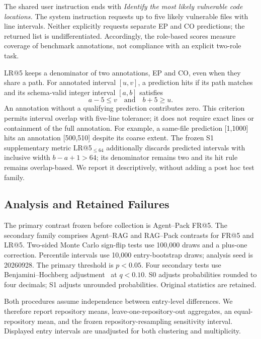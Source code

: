 The shared user instruction ends with \emph{Identify the most likely vulnerable code locations.} The system instruction requests up to five likely vulnerable files with line intervals. Neither explicitly requests separate EP and CO predictions; the returned list is undifferentiated. Accordingly, the role-based scores measure coverage of benchmark annotations, not compliance with an explicit two-role task.

LR@5 keeps a denominator of two annotations, EP and CO, even when they share a path. For annotated interval $[u,v]$, a prediction hits if its path matches and its schema-valid integer interval $[a,b]$ satisfies
\begin{equation}
 a-5\leq v\quad\text{and}\quad b+5\geq u.
\end{equation}
An annotation without a qualifying prediction contributes zero. This criterion permits interval overlap with five-line tolerance; it does not require exact lines or containment of the full annotation. For example, a same-file prediction [1,1000] hits an annotation [500,510] despite its coarse extent. The frozen S1 supplementary metric LR@5$_{\leq64}$ additionally discards predicted intervals with inclusive width $b-a+1>64$; its denominator remains two and its hit rule remains overlap-based. We report it descriptively, without adding a post hoc test family.

\subsection{Analysis and Retained Failures}
The primary contrast frozen before collection is Agent--Pack FR@5. The secondary family comprises Agent--RAG and RAG--Pack contrasts for FR@5 and LR@5. Two-sided Monte Carlo sign-flip tests use 100,000 draws and a plus-one correction. Percentile intervals use 10,000 entry-bootstrap draws; analysis seed is 20260928. The primary threshold is $p<0.05$. Four secondary tests use Benjamini--Hochberg adjustment~\cite{bh} at $q<0.10$. S0 adjusts probabilities rounded to four decimals; S1 adjusts unrounded probabilities. Original statistics are retained.

Both procedures assume independence between entry-level differences. We therefore report repository means, leave-one-repository-out aggregates, an equal-repository mean, and the frozen repository-resampling sensitivity interval. Displayed entry intervals are unadjusted for both clustering and multiplicity.

